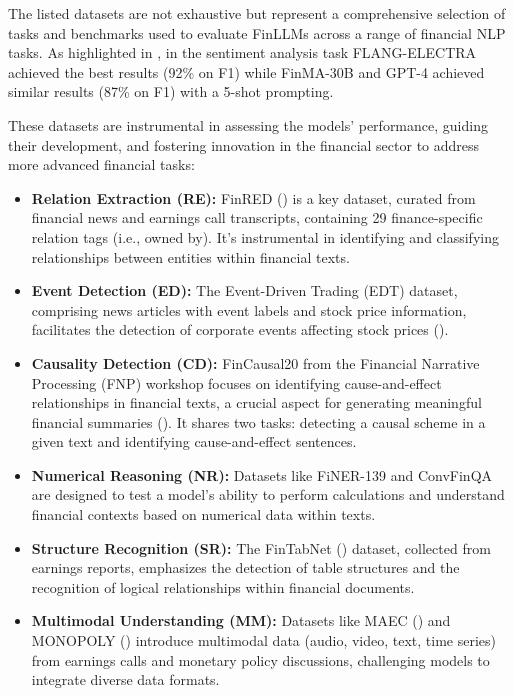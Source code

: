 The listed datasets are not exhaustive but represent a comprehensive selection of tasks and benchmarks used to evaluate FinLLMs across a range of financial NLP tasks.
As highlighted in \textcite{lee2024survey}, in the sentiment analysis task FLANG-ELECTRA achieved the best results (92\% on F1) while FinMA-30B and GPT-4 achieved similar results (87\% on F1) with a 5-shot prompting.

These datasets are instrumental in assessing the models' performance, guiding their development, and fostering innovation in the financial sector to address more advanced financial tasks:

\begin{itemize}
	\item \textbf{Relation Extraction (RE):} {FinRED (\textcite{sharma2022finred}) is a key dataset, curated from financial news and earnings call transcripts, containing 29 finance-specific relation tags (i.e., owned by). It's instrumental in identifying and classifying relationships between entities within financial texts.}
	\item \textbf{Event Detection (ED):} The Event-Driven Trading (EDT) dataset, comprising news articles with event labels and stock price information, facilitates the detection of corporate events affecting stock prices (\textcite{zhou2021trade}).
	\item \textbf{Causality Detection (CD):} {FinCausal20 from the Financial Narrative Processing (FNP) workshop focuses on identifying cause-and-effect relationships in financial texts, a crucial aspect for generating meaningful financial summaries (\textcite{mariko2020financial}). It shares two tasks: detecting a causal scheme in a given text and identifying cause-and-effect sentences.}
	\item \textbf{Numerical Reasoning (NR):} Datasets like FiNER-139 and ConvFinQA are designed to test a model's ability to perform calculations and understand financial contexts based on numerical data within texts.
	\item \textbf{Structure Recognition (SR):} The FinTabNet (\textcite{zheng2021global}) dataset, collected from earnings reports, emphasizes the detection of table structures and the recognition of logical relationships within financial documents.
	\item \textbf{Multimodal Understanding (MM):} Datasets like MAEC (\textcite{li2020maec}) and MONOPOLY (\textcite{mathur2022monopoly}) introduce multimodal data (audio, video, text, time series) from earnings calls and monetary policy discussions, challenging models to integrate diverse data formats.

\end{itemize}
